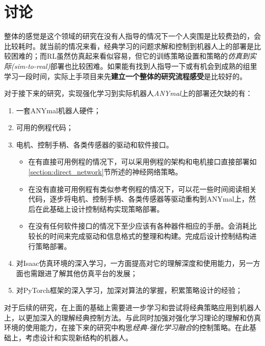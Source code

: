 
\chapter[讨论]{讨论}
整体的感觉是这个领域的研究在没有人指导的情况下一个人突围是比较费劲的，会比较耗时。就当前的情况来看，经典学习的问题求解和控制到机器人上的部署是比较困难的；而RL虽然仿真起来看似容易，但它的训练策略设置和策略的\emph{仿真到实际(sim-to-real)}部署也比较困难。如果能有找到人指导一下或有机会到成熟的组里学习一段时间，实际上手项目来先\textbf{建立一个整体的研究流程感受}是比较好的。

对于接下来的研究，实现强化学习到实际机器人\emph{ANYmal}上的部署还欠缺的有：
\begin{enumerate}
    \item 一套ANYmal机器人硬件；
    \item 可用的例程代码；
    \item 电机、控制手柄、各类传感器的驱动和软件接口。
    \begin{itemize}
        \item 在有直接可用例程的情况下，可以采用例程的架构和电机接口直接部署如\ref{section:direct_network}节所述的神经网络策略。
        \item 在没有直接可用例程有类似参考例程的情况下，可以花一些时间阅读相关代码，逐步将电机、控制手柄、各类传感器等驱动重构到ANYmal上，然后在此基础上设计控制结构实现策略部署。
        \item 在没有任何软件接口的情况下至少应该有各种器件相应的手册。会消耗比较长的时间来完成驱动和信息格式的整理和构建。完成后设计控制结构进行策略部署。
    \end{itemize}
    \item 对Isaac仿真环境的深入学习，一方面提高对它的理解深度和使用能力，另一方面也需跟进了解其他仿真平台的发展；
    \item 对PyTorch框架的深入学习，加深对算法的掌握，积累策略设计的经验；
\end{enumerate}

对于后续的研究，在上面的基础上需要进一步学习和尝试将经典策略应用到机器人上，以更加深入的理解经典控制方法。与此同时加强对强化学习理论的理解和仿真环境的使用能力，在接下来的研究中构思\emph{经典-强化学习融合}的控制策略。在此基础上，考虑设计和实现新结构的机器人。